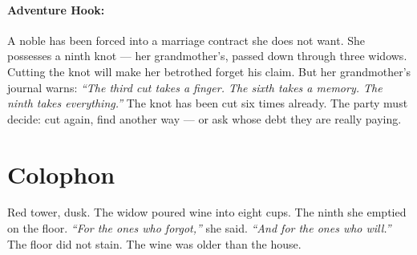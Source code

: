 \paragraph{Adventure Hook:}
A noble has been forced into a marriage contract she does not want. She possesses a ninth knot --- her grandmother's, passed down through three widows. Cutting the knot will make her betrothed forget his claim. But her grandmother's journal warns: \textit{``The third cut takes a finger. The sixth takes a memory. The ninth takes everything.''} The knot has been cut six times already. The party must decide: cut again, find another way --- or ask whose debt they are really paying.

\section*{Colophon}
Red tower, dusk. The widow poured wine into eight cups. The ninth she emptied on the floor. \textit{``For the ones who forgot,''} she said. \textit{``And for the ones who will.''} The floor did not stain. The wine was older than the house.
